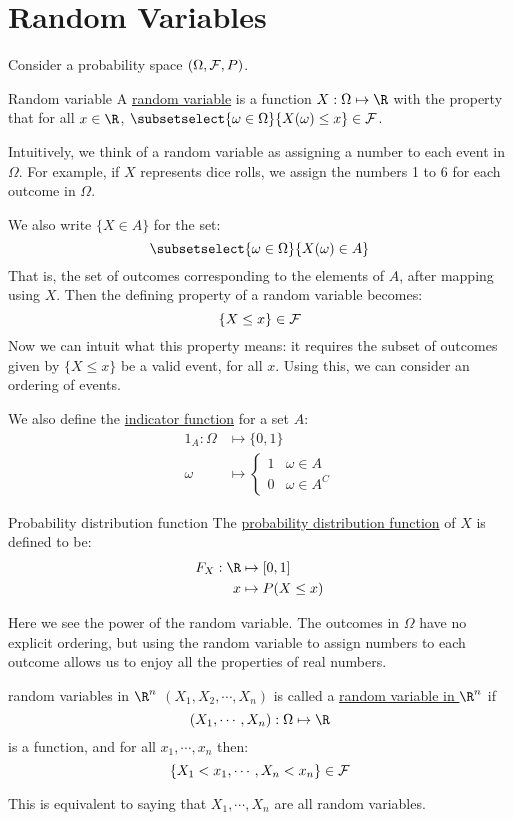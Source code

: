 \documentclass[../Main.tex]{subfiles}
\begin{document}
\section{Random Variables}
Consider a probability space $(\Omega, \mathcal{F}, P)$.
\begin{definition}{Random variable}
    A \underline{random variable} is a function $X: \Omega \mapsto \R$ with the property that for all $x \in \R$, $\subsetselect{\omega \in \Omega}{X(\omega) \leq x} \in \sigalg$.
\end{definition}
Intuitively, we think of a random variable as assigning a number to each event in $\Omega$. For example, if $X$ represents dice rolls, we assign the numbers 1 to 6 for each outcome in $\Omega$.\par
We also write $\{X \in A\}$ for the set:
\begin{equation*}
    \subsetselect{\omega \in \Omega}{X(\omega) \in A}
\end{equation*}
That is, the set of outcomes corresponding to the elements of $A$, after mapping using $X$. Then the defining property of a random variable becomes:
\begin{equation*}
    \{X \leq x\} \in \mathcal{F}
\end{equation*}
Now we can intuit what this property means: it requires the subset of outcomes given by $\{X \leq x\}$ be a valid event, for all $x$. Using this, we can consider an ordering of events.\par
We also define the \underline{indicator function} for a set $A$:
\begin{align*}
    1_A : \Omega &\mapsto \{0, 1\} \\
    \omega &\mapsto
    \begin{cases}
        1 & \omega \in A \\
        0 & \omega \in A^C
    \end{cases}
\end{align*}
\begin{definition}{Probability distribution function}
    The \underline{probability distribution function} of $X$ is defined to be:
    \begin{align*}
        F_X : \R &\mapsto [0, 1] \\
        x &\mapsto P(X \leq x)
    \end{align*}
\end{definition}
Here we see the power of the random variable. The outcomes in $\Omega$ have no explicit ordering, but using the random variable to assign numbers to each outcome allows us to enjoy all the properties of real numbers.
\begin{definition}{random variables in $\R^n$}
    $(X_1, X_2, \cdots, X_n)$ is called a \underline{random variable in $\R^n$} if
    \begin{equation*}
        (X_1, \cdots, X_n) : \Omega \mapsto \R
    \end{equation*}
    is a function, and for all $x_1, \cdots, x_n$ then:
    \begin{equation*}
        \{X_1 < x_1, \cdots, X_n < x_n\} \in \mathcal{F}
    \end{equation*}
\end{definition}
This is equivalent to saying that $X_1, \cdots, X_n$ are all random variables.
\end{document}
